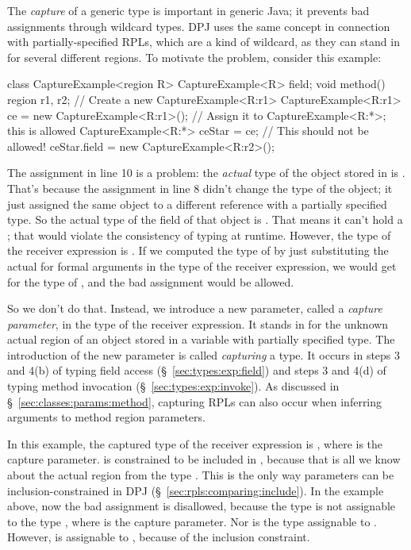 The \emph{capture} of a generic type is important in generic Java; it
prevents bad assignments through wildcard types.  DPJ uses the same
concept in connection with partially-specified RPLs, which are a kind
of wildcard, as they can stand in for several different regions.  To
motivate the problem, consider this example:
%
\begin{numbereddpjlisting}
class CaptureExample<region R> {
  CaptureExample<R> field;
  void method() {
    region r1, r2;
    // Create a new CaptureExample<R:r1>
    CaptureExample<R:r1> ce = new CaptureExample<R:r1>();
    // Assign it to CaptureExample<R:*>; this is allowed
    CaptureExample<R:*> ceStar = ce;
    // This should not be allowed!
    ceStar.field = new CaptureExample<R:r2>();
  }
}
\end{numbereddpjlisting}
%
The assignment in line 10 is a problem: the \emph{actual} type of the
object stored in  is .  That's
because the assignment in line 8 didn't change the type of the object;
it just assigned the same object to a different reference with a
partially specified type.  So the actual type of the  field
of that object is .  That means it can't
hold a ; that would violate the consistency
of typing at runtime.  However, the type of the receiver expression
 is .  If we computed the type of
 by just substituting the actual for formal
arguments in the type of the receiver expression, we would get
 for the type of , and the
bad assignment would be allowed.

So we don't do that.  Instead, we introduce a new parameter, called a
\emph{capture parameter}, in the type of the receiver expression.  It
stands in for the unknown actual region of an object stored in a
variable with partially specified type.  The introduction of the new
parameter is called \emph{capturing} a type.  It occurs in steps 3 and
4(b) of typing field access (\S~\ref{sec:types:exp:field}) and steps 3
and 4(d) of typing method invocation (\S~\ref{sec:types:exp:invoke}).
As discussed in \S~\ref{sec:classes:params:method}, capturing RPLs can
also occur when inferring arguments to method region parameters.

In this example, the captured type of the receiver expression is
, where  is the capture parameter.
 is constrained to be included in , because that is
all we know about the actual region from the type
.  This is the only way parameters can be
inclusion-constrained in DPJ (\S~\ref{sec:rpls:comparing:include}).
In the example above, now the bad assignment is disallowed, because
the type  is not assignable to the type
, where  is the capture parameter.  Nor
is the type  assignable to
.  However,  is
assignable to , because of the inclusion
constraint.

